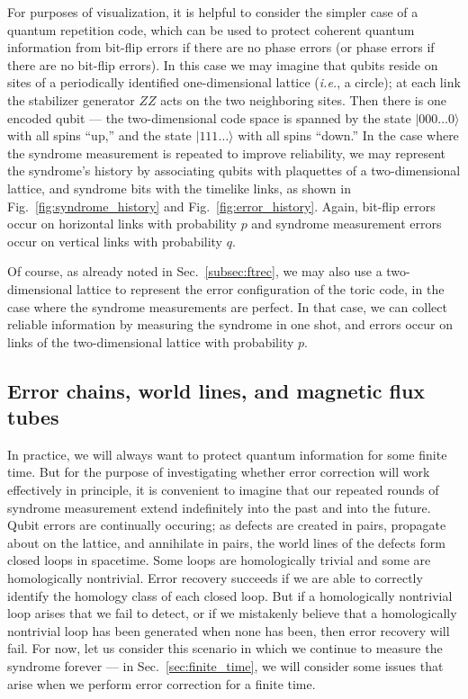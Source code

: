 For purposes of visualization, it is helpful to consider the simpler case of a quantum repetition code, which can be used to protect coherent quantum information from bit-flip errors if there are no phase errors (or phase errors if there are no bit-flip errors). In this case we may imagine that qubits reside on sites of a periodically identified one-dimensional lattice ({\it i.e.}, a circle); at each link the stabilizer generator $ZZ$ acts on the two neighboring sites. Then there is one encoded qubit --- the two-dimensional code space is spanned by the state $|000\dots 0\rangle$ with all spins ``up,'' and the state $|111\dots\rangle$ with all spins ``down.'' In the case where the syndrome measurement is repeated to improve reliability, we may represent the syndrome's history by associating qubits with plaquettes of a two-dimensional lattice, and syndrome bits with the timelike links, as shown in Fig.~\ref{fig:syndrome_history} and Fig.~\ref{fig:error_history}. Again, bit-flip errors occur on horizontal links with probability $p$ and syndrome measurement errors occur on vertical links with probability $q$. 

Of course, as already noted in Sec.~\ref{subsec:ftrec}, we may also use a two-dimensional lattice to represent the error configuration of the toric code, in the case where the syndrome measurements are perfect. In that case, we can collect reliable information by measuring the syndrome in one shot, and errors occur on links of the two-dimensional lattice with probability $p$.

\subsection{Error chains, world lines, and magnetic flux tubes}

In practice, we will always want to protect quantum information for some finite time. But for the purpose of investigating whether error correction will work effectively in principle, it is convenient to imagine that our repeated rounds of syndrome measurement extend indefinitely into the past and into the future. Qubit errors are continually occuring; as defects are created in pairs, propagate about on the lattice, and annihilate in pairs, the world lines of the defects form closed loops in spacetime. Some loops are homologically trivial and some are homologically nontrivial. Error recovery succeeds if we are able to correctly identify the homology class of each closed loop. But if a homologically nontrivial loop arises that we fail to detect, or if we mistakenly believe that a homologically nontrivial loop has been generated when none has been, then error recovery will fail. For now, let us consider this scenario in which we continue to measure the syndrome forever --- in Sec.~\ref{sec:finite_time}, we will consider some issues that arise when we perform error correction for a finite time. 

